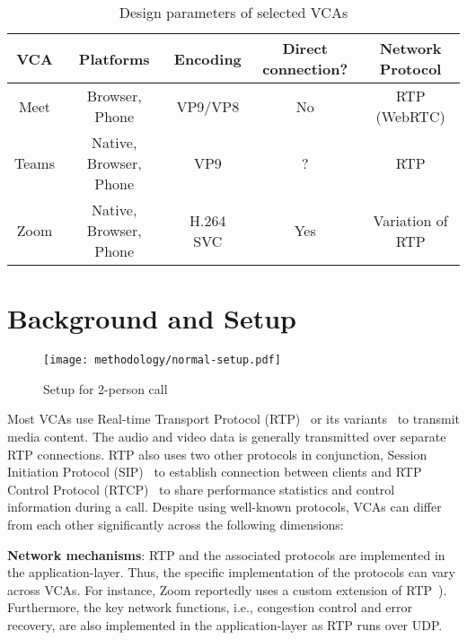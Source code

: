 \begin{table*}[ht!]
\centering
\begin{tabular}{|c|c|c|c|c|}
\hline
\textbf{VCA} & \textbf{Platforms}     & \textbf{Encoding} & \textbf{Direct connection?} & \textbf{Network Protocol} \\ \hline
\hline 
Meet  & Browser, Phone         & VP9/VP8   & No                 & RTP (WebRTC)     \\ \hline
Teams & Native, Browser, Phone & VP9       & ?                  & RTP              \\ \hline
Zoom  & Native, Browser, Phone & H.264 SVC & Yes                & Variation of RTP \\ \hline
\end{tabular}
\caption{Design parameters of selected VCAs}
\label{tab:vca_overview}
\end{table*}

\section{Background and Setup}

\begin{figure}[h]
\centering
\texttt{[image: methodology/normal-setup.pdf]}
\caption{Setup for 2-person call}
\label{fig:static_setup}
\end{figure}


\label{sec:background}
Most VCAs use Real-time Transport Protocol (RTP)~\cite{schulzrinne1996rtp, schulzrinne2003rfc3550} or its variants~\cite{baugher2004secure, zoom_rtp} to transmit media content. The audio and video data is generally transmitted over separate RTP connections. RTP also uses two other protocols in conjunction, Session Initiation Protocol (SIP)~\cite{rosenberg2002sip} to establish connection between clients and RTP Control Protocol (RTCP)~\cite{schulzrinne2003rfc3550} to share performance statistics and control information during a call. Despite using well-known protocols, VCAs can differ from each other significantly across the following dimensions:



\textbf{Network mechanisms}: RTP and the associated protocols are implemented in the application-layer. Thus, the specific implementation of the protocols can vary across VCAs. For instance, Zoom reportedly uses a custom extension of RTP~\cite{zoom_rtp}). Furthermore, the key network functions, i.e., congestion control and error recovery, are also implemented in the application-layer as RTP runs over UDP.

